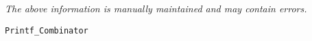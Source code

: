 \label{pkg:printf\_combinator}

{\tiny \it The above information is manually maintained and may contain errors.}
\begin{verbatim}
Printf_Combinator
\end{verbatim}
